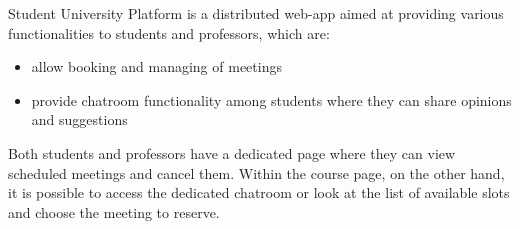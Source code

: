 Student University Platform is a distributed web-app aimed at providing various functionalities to students and professors, which are:
\begin{itemize}
    \item allow booking and managing of meetings
    \item provide chatroom functionality among students where they can share opinions and suggestions
\end{itemize}
Both students and professors have a dedicated page where they can view scheduled meetings and cancel them. Within the course page, on the other hand, it is possible to access the dedicated chatroom or look at the list of available slots and choose the meeting to reserve.
